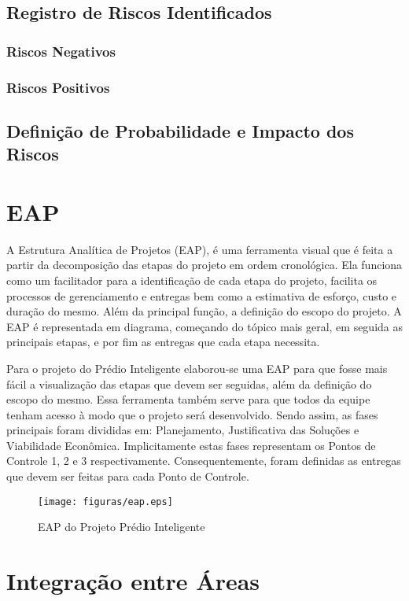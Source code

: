\section{Registro de Riscos Identificados}
\subsection{Riscos Negativos}
\subsection{Riscos Positivos}



\section{Definição de Probabilidade e Impacto dos Riscos}



\chapter{EAP}
A Estrutura Analítica de Projetos (EAP), é uma ferramenta visual que é feita a partir da decomposição das etapas do projeto em ordem cronológica. Ela funciona como um facilitador para a identificação de cada etapa do projeto, facilita os processos de gerenciamento e entregas bem como a estimativa de esforço, custo e duração do mesmo. Além da principal função, a definição do escopo do projeto. A EAP é representada em diagrama, começando do tópico mais geral, em seguida as principais etapas, e por fim as entregas que cada etapa necessita.

Para o projeto do Prédio Inteligente elaborou-se uma EAP para que fosse mais fácil a visualização das etapas que devem ser seguidas, além da definição do escopo do mesmo. Essa ferramenta também serve para que todos da equipe tenham acesso à modo que o projeto será desenvolvido. Sendo assim, as fases principais foram divididas em: Planejamento, Justificativa das Soluções e Viabilidade Econômica. Implicitamente estas fases representam os Pontos de Controle 1, 2 e 3 respectivamente. Consequentemente, foram definidas as entregas que devem ser feitas para cada Ponto de Controle.
 \begin{figure}[!h]
 	\centering
 	\texttt{[image: figuras/eap.eps]}
 	\caption{EAP do Projeto Prédio Inteligente}
 	\label{fig01}
 \end{figure}

\chapter{Integração entre Áreas}
